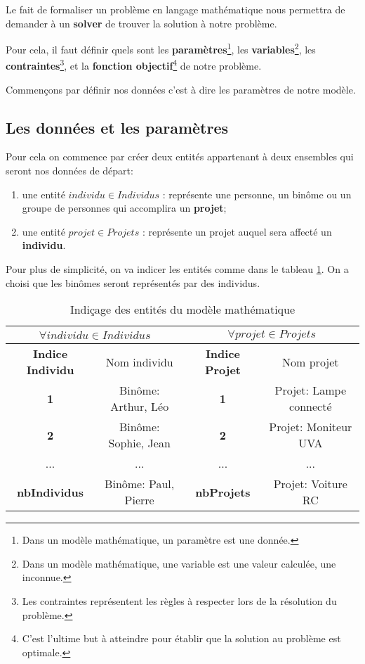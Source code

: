 \documentclass{polytech/polytech}
\begin{document}
Le fait de formaliser un problème en langage mathématique nous permettra de demander à un \textbf{solver} de trouver la solution à notre problème.

Pour cela, il faut définir quels sont les \textbf{paramètres}\footnote{Dans un modèle mathématique, un paramètre est une donnée.}, les \textbf{ variables}\footnote{Dans un modèle mathématique, une variable est une valeur calculée, une inconnue.}, les \textbf{contraintes}\footnote{Les contraintes représentent les règles à respecter lors de la résolution du problème.}, et la \textbf{fonction objectif}\footnote{C'est l'ultime but à atteindre pour établir que la solution au problème est optimale.} de notre problème.

Commençons par définir nos données c'est à dire les paramètres de notre modèle.
\subsection{Les données et les paramètres}
\label{sec:donnees_params}
Pour cela on commence par créer deux entités appartenant à deux ensembles qui seront nos données de départ:
\begin{enumerate}
\item une entité $individu \in Individus$ : représente une personne, un binôme ou un groupe de personnes qui accomplira un \textbf{projet};
\item une entité  $projet \in Projets$ : représente un projet auquel sera affecté un \textbf{individu}.
\end{enumerate}

Pour plus de simplicité, on va indicer les entités comme dans le tableau \ref{tab:indice_entite_mod_math}. On a choisi que les binômes seront représentés par des individus.
\begin{table}
\caption{Indiçage des entités du modèle mathématique}
\label{tab:indice_entite_mod_math}
\begin{tabular}{|c|c|c|c|}
\hline
\multicolumn{2}{|c|}{$\forall individu \in Individus$} & \multicolumn{2}{|c|}{$\forall projet \in Projets$} \\
\hline
\textbf{Indice Individu} & Nom individu &\textbf{ Indice Projet} & Nom projet \\
\hline
\textbf{1} & Binôme: Arthur, Léo & \textbf{1} & Projet: Lampe connecté \\
\hline
\textbf{2} & Binôme: Sophie, Jean & \textbf{2} & Projet: Moniteur UVA \\
\hline
... & ... & ... & ... \\
\hline
\textbf{nbIndividus} & Binôme: Paul, Pierre &\textbf{ nbProjets} & Projet: Voiture RC \\
\hline
\end{tabular}
\end{table}
\end{document}
